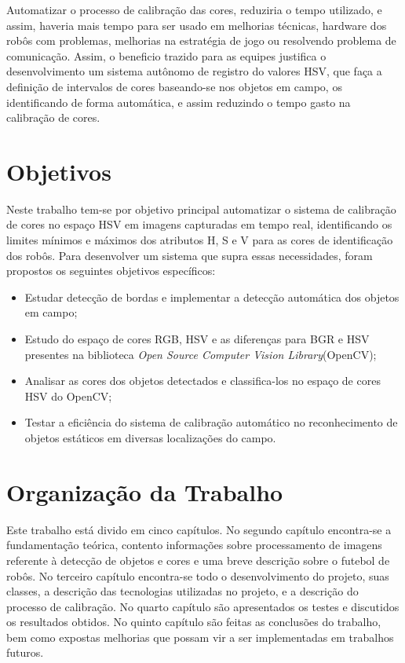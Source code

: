 Automatizar o processo de calibração das cores, reduziria o tempo utilizado, e assim, haveria mais tempo para ser usado em melhorias técnicas, hardware dos robôs com problemas, melhorias na estratégia de jogo ou resolvendo problema de comunicação. Assim, o beneficio trazido para as equipes justifica o desenvolvimento um sistema autônomo de registro do valores HSV, que faça a definição de intervalos de cores baseando-se nos objetos em campo, os identificando de forma automática, e assim reduzindo o tempo gasto na calibração de cores. 
\section{Objetivos}
Neste trabalho tem-se por objetivo principal automatizar o sistema de calibração de cores no espaço HSV em imagens capturadas em tempo real, identificando os limites mínimos e máximos dos atributos H, S e V para as cores de identificação dos robôs.  
Para desenvolver um sistema que supra essas necessidades, foram propostos os seguintes objetivos específicos:

\begin{itemize}
	\item Estudar detecção de bordas e implementar a detecção automática dos objetos em campo; 
	\item Estudo do espaço de cores RGB, HSV e as diferenças para BGR e HSV presentes na biblioteca {\it Open Source Computer Vision Library}(OpenCV);
	\item Analisar as cores dos objetos detectados e classifica-los no espaço de cores HSV do OpenCV;
	\item Testar a eficiência do sistema de calibração automático no reconhecimento de objetos estáticos em diversas localizações do campo.
	
	
\end{itemize}

\section{Organização da Trabalho} \label{Sec:Organizacao}

Este trabalho está divido em cinco capítulos. No segundo capítulo encontra-se a fundamentação teórica, contento informações sobre processamento de imagens referente à detecção de objetos e cores e uma breve descrição sobre o futebol de robôs. No terceiro capítulo encontra-se todo o desenvolvimento do projeto, suas classes, a descrição das tecnologias utilizadas no projeto, e a descrição do processo de calibração. No quarto capítulo são apresentados os testes e discutidos os resultados obtidos. No quinto capítulo são feitas as conclusões do trabalho, bem como expostas melhorias que possam vir a ser implementadas em trabalhos futuros.

